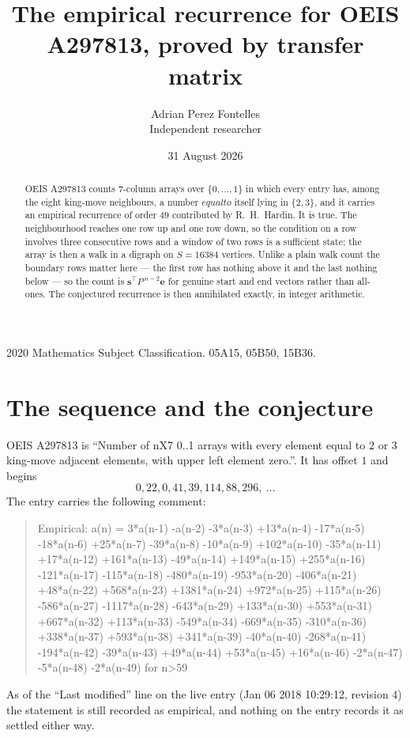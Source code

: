 \documentclass[11pt,a4paper]{article}
\title{The empirical recurrence for OEIS A297813, proved by transfer matrix}
\author{Adrian Perez Fontelles\\ \small Independent researcher}
\date{31 August 2026}
\theoremstyle{plain}
\theoremstyle{definition}
\begin{document}
\maketitle

\begin{abstract}
OEIS A297813 counts $7$-column arrays over $\{0,\dots,1\}$ in which every entry has,
among the eight king-move neighbours, a number $equal to$ itself lying in $\{2,3\}$, and it carries an empirical
recurrence of order $49$ contributed by R.~H.~Hardin. It is true. The neighbourhood
reaches one row up and one row down, so the condition on a row involves three consecutive
rows and a window of two rows is a sufficient state; the array is then a walk in a digraph
on $S=16384$ vertices. Unlike a plain walk count the boundary rows matter here --- the first
row has nothing above it and the last nothing below --- so the count is
$\mathbf{s}^{\!\top}P^{\,n-2}\mathbf{e}$ for genuine start and end vectors rather than
all-ones. The conjectured recurrence is then annihilated exactly, in integer arithmetic.
\end{abstract}

\noindent\small 2020 Mathematics Subject Classification. 05A15, 05B50, 15B36.\normalsize

\section{The sequence and the conjecture}

OEIS A297813 is ``Number of nX7 0..1 arrays with every element equal to 2 or 3 king-move adjacent elements, with upper left element zero.''. It has offset
$1$ and begins
\[
0, 22, 0, 41, 39, 114, 88, 296,\ \dots
\]
The entry carries the following comment:
\begin{quote}\small
Empirical: a(n) = 3*a(n-1) -a(n-2) -3*a(n-3) +13*a(n-4) -17*a(n-5) -18*a(n-6) +25*a(n-7) -39*a(n-8) -10*a(n-9) +102*a(n-10) -35*a(n-11) +17*a(n-12) +161*a(n-13) -49*a(n-14) +149*a(n-15) +255*a(n-16) -121*a(n-17) -115*a(n-18) -480*a(n-19) -953*a(n-20) -406*a(n-21) +48*a(n-22) +568*a(n-23) +1381*a(n-24) +972*a(n-25) +115*a(n-26) -586*a(n-27) -1117*a(n-28) -643*a(n-29) +133*a(n-30) +553*a(n-31) +667*a(n-32) +113*a(n-33) -549*a(n-34) -669*a(n-35) -310*a(n-36) +338*a(n-37) +593*a(n-38) +341*a(n-39) -40*a(n-40) -268*a(n-41) -194*a(n-42) -39*a(n-43) +49*a(n-44) +53*a(n-45) +16*a(n-46) -2*a(n-47) -5*a(n-48) -2*a(n-49) for n>59
\end{quote}
As of the ``Last modified'' line on the live entry (Jan 06 2018 10:29:12, revision
4) the statement is still recorded as empirical, and nothing on the entry
records it as settled either way.
\end{document}
